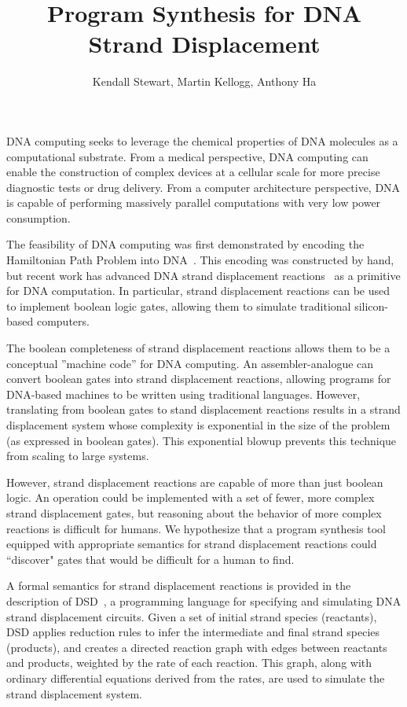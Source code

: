 \documentclass{article}
\begin{document}
\title{Program Synthesis for DNA Strand Displacement}
\author{Kendall Stewart, Martin Kellogg, Anthony Ha}

\maketitle

DNA computing seeks to leverage the chemical properties
of DNA molecules as a computational substrate.
From a medical perspective, DNA computing can enable the
construction of complex devices at a cellular scale for more precise
diagnostic tests or drug delivery. From a computer architecture perspective,
DNA is capable of performing massively parallel computations with very low
power consumption.

The feasibility of DNA computing was first demonstrated by encoding
the Hamiltonian Path Problem into DNA~\cite{adelman}.
This encoding was constructed by
hand, but recent work has advanced DNA strand displacement
reactions~\cite{strands} as a primitive for DNA computation. In particular,
strand displacement reactions can be used to implement boolean logic gates,
allowing them to simulate traditional silicon-based computers.

The boolean completeness of strand displacement reactions allows them to be
a conceptual ''machine code'' for DNA computing. An assembler-analogue
can convert boolean gates into strand displacement reactions, allowing
programs for DNA-based machines to be written using traditional languages.
However, translating from boolean gates to stand displacement reactions
results in a strand displacement system whose complexity is exponential in the
size of the problem (as expressed in boolean gates). This exponential blowup
prevents this technique from scaling to large systems.

However, strand displacement reactions are capable of more than just boolean
logic. An operation could be implemented with a set of fewer, more
complex strand displacement gates, but reasoning about the behavior of more
complex reactions is difficult for humans.
We hypothesize that a program synthesis tool
equipped with appropriate semantics for strand displacement reactions could
``discover" gates that would be difficult for a human to find.

A formal semantics for strand displacement reactions is provided in the
description of DSD~\cite{dsd}, a programming language for specifying and
simulating DNA strand displacement circuits. Given a set of initial strand
species (reactants), DSD applies reduction rules to infer the intermediate and
final strand species (products), and creates a directed reaction graph with
edges between reactants and products, weighted by the rate of each reaction.
This graph, along with ordinary differential equations derived from the rates,
are used to simulate the strand displacement system.
\end{document}
